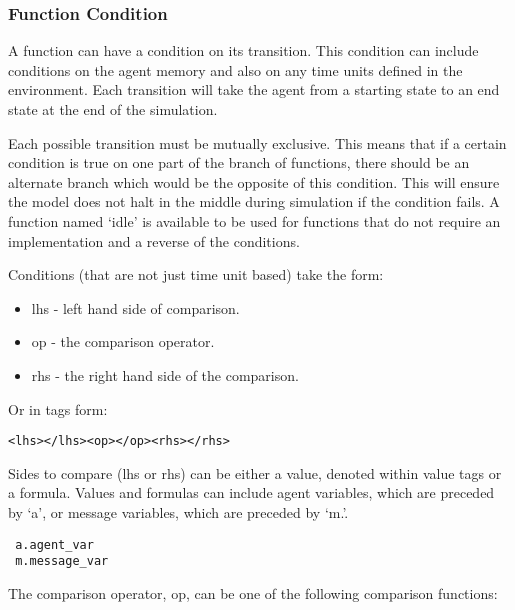 \subsubsection{Function Condition}
\label{functioncond}

A function can have a condition on its transition. This condition can include
conditions on the agent memory and also on any time units defined in the
environment. Each transition will take the agent from a starting state to an end state at the end of the simulation.

Each possible transition
must be mutually exclusive. This means that if a certain condition is true on one part of the branch of functions, there should be an alternate branch which would be the opposite of this condition. This will ensure the model does not halt in the middle during simulation if the condition fails. A function named `idle' is available to be used for
functions that do not require an implementation and a reverse of the conditions.

Conditions (that are not just time unit based) take the form:

\begin{itemize}
  \item lhs - left hand side of comparison.
  \item op - the comparison operator.
  \item rhs - the right hand side of the comparison.
\end{itemize}

Or in tags form:

\begin{mylisting}
\begin{verbatim}
<lhs></lhs><op></op><rhs></rhs>
\end{verbatim}
\end{mylisting}

Sides to compare (lhs or rhs) can be either a value, denoted within value tags or
a formula.
Values and formulas can include agent variables, which are preceded by `a', or message variables, which are preceded by `m.'.

 \begin{mylisting}
 \begin{verbatim}
 a.agent_var
 m.message_var
 \end{verbatim}
 \end{mylisting}

The comparison operator, op, can be one of the following comparison functions:

